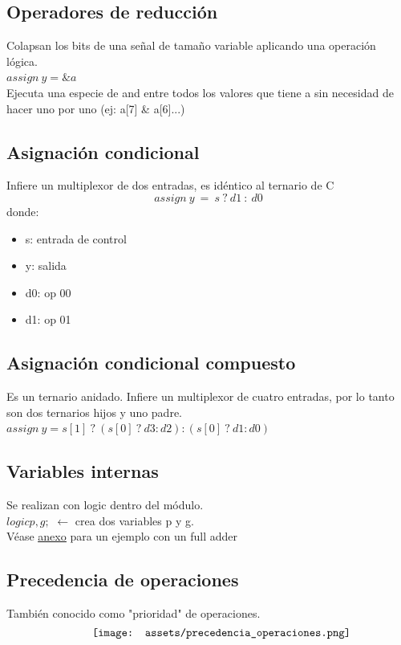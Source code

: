 \documentclass[10pt,a4paper]{article}
\begin{document}
\subsection*{Operadores de reducción}
Colapsan los bits de una señal de tamaño variable aplicando una operación lógica. \\
$assign \ y = \&a$ \\
Ejecuta una especie de and entre todos los valores que tiene a sin necesidad de hacer uno por uno (ej: a[7] \& a[6]...) \\
\subsection*{Asignación condicional}
Infiere un multiplexor de dos entradas, es idéntico al ternario de C 
\[assign \ y \ = \ s \ ? \ d1 \ : \ d0\] 
donde:
\begin{itemize}
    \item s: entrada de control
    \item y: salida 
    \item d0: op 00 
    \item d1: op 01
\end{itemize}
\subsection*{Asignación condicional compuesto}
Es un ternario anidado. Infiere un multiplexor de cuatro entradas, por lo tanto son dos ternarios hijos y uno padre.
$ assign \ y = s[1] \ ? \ (s[0] \ ? \ d3 : d2) : (s[0] \ ? \ d1 : d0)$
\subsection*{Variables internas}
Se realizan con logic dentro del módulo. \\
$logic p, g;$ $ \leftarrow  $ crea dos variables p y g. \\
Véase \hyperref[subsec:SVL_FullAdder]{\underline{anexo}} para un ejemplo con un full adder

\subsection*{Precedencia de operaciones}
También conocido como "prioridad" de operaciones.
\[\begin{minipage}[b]{0.6\textwidth}
    \texttt{[image: assets/precedencia\_operaciones.png]}
    \label{fig:precedencia_operaciones}
\end{minipage}\]
\end{document}
